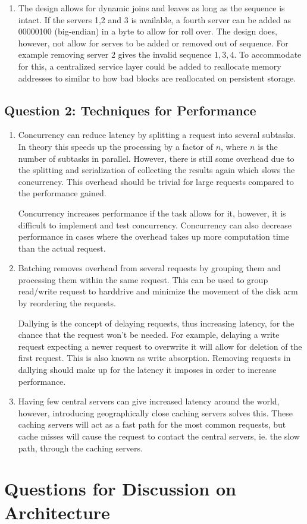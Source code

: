 \documentclass[10pt,a4paper]{article}
\begin{document}
\begin{enumerate}
	\item The design allows for dynamic joins and leaves as long as the sequence is intact. If the servers 1,2 and 3 is available, a fourth server can be added as 00000100 (big-endian) in a byte to allow for roll over. The design does, however, not allow for serves to be added or removed out of sequence. For example removing server 2 gives the invalid sequence $1,3,4$. To accommodate for this, a centralized service layer could be added to reallocate memory addresses to similar to how bad blocks are reallocated on persistent storage.
	
	
\end{enumerate}

\subsection*{Question 2: Techniques for Performance}
\begin{enumerate}
	\item 
	Concurrency can reduce latency by splitting a request into several subtasks. In theory this speeds up the processing by a factor of $n$, where $n$ is the number of subtasks in parallel. However, there is still some overhead due to the splitting and serialization of collecting the results again which slows the concurrency. This overhead should be trivial for large requests compared to the performance gained.
	
	Concurrency increases performance if the task allows for it, however, it is difficult to implement and test concurrency. Concurrency can also decrease performance in cases where the overhead takes up more computation time than the actual request.
	
	\item
	Batching removes overhead from several requests by grouping them and processing them within the same request. This can be used to group read/write request to harddrive and minimize the movement of the disk arm by reordering the requests.
	
	Dallying is the concept of delaying requests, thus increasing latency, for the chance that the request won't be needed. For example, delaying a write request expecting a newer request to overwrite it will allow for deletion of the first request. This is also known as write absorption. Removing requests in dallying should make up for the latency it imposes in order to increase performance. 
	
	\item
	Having few central servers can give increased latency around the world, however, introducing geographically close caching servers solves this. These caching servers will act as a fast path for the most common requests, but cache misses will cause the request to contact the central servers, ie. the slow path, through the caching servers.
	
\end{enumerate}

\section*{Questions for Discussion on Architecture}
\end{document}
